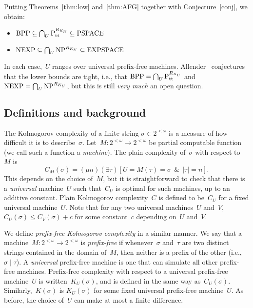 \documentclass{LMCS}
\newcommand{\0}{\mathbf{0}}
\newcommand{\<}{\langle}
\renewcommand{\>}{\rangle}
\begin{document}
Putting Theorems~\ref{thm:low} and~\ref{thm:AFG} together with
Conjecture~\ref{conj}, we obtain:
\begin{itemize}
\item $\textup{BPP}\subseteq\bigcap_{U}\textup{P}_\text{tt}^{R_{K_U}}
    \subseteq\textup{PSPACE}$
\item $\textup{NEXP}\subseteq\bigcap_{U}\textup{NP}^{R_{K_U}}
    \subseteq\textup{EXPSPACE}$
\end{itemize}
In each case,~$U$ ranges over universal prefix-free machines.
Allender~\cite{allender} conjectures that the lower bounds are tight, i.e.,
that $\textup{BPP} = \bigcap_{U}\textup{P}_\text{tt}^{R_{K_U}}$ and
$\textup{NEXP} = \bigcap_{U}\textup{NP}^{R_{K_U}}$, but this is still
\emph{very much} an open question.

\subsection{Definitions and background}\label{background}

The Kolmogorov complexity of a finite string \mbox{$\sigma\in 2^{<\omega}$}
is a measure of how difficult it is to describe~$\sigma$. Let~$M\colon
2^{<\omega}\to 2^{<\omega}$ be partial computable function (we call such a
function a \emph{machine}). The plain complexity of~$\sigma$ with respect
to~$M$ is
\[
C_M(\sigma)=(\mu n)(\exists \tau)[U=M(\tau)=\sigma\ \ \& \ \ |\tau|=n].
\]
This depends on the choice of~$M$, but it is straightforward to check that
there is a \emph{universal} machine~$U$ such that~$C_U$ is optimal for such
machines, up to an additive constant. Plain Kolmogorov complexity~$C$ is
defined to be~$C_U$ for a fixed universal machine~$U$. Note that for any two
universal machines~$U$ and~$V$, $C_U(\sigma)\leq C_V(\sigma)+c$ for some
constant~$c$ depending on~$U$ and~$V$.

We define \emph{prefix-free Kolmogorov complexity} in a similar manner. We
say that a machine~$M\colon 2^{<\omega}\to 2^{<\omega}$ is \emph{prefix-free}
if whenever~$\sigma$ and~$\tau$ are two distinct strings contained in the
domain of~$M$, then neither is a prefix of the other (i.e.,
$\sigma\mid\tau$).  A \emph{universal} prefix-free machine is one that can
simulate all other prefix-free machines. Prefix-free complexity with respect
to a universal prefix-free machine~$U$ is written~$K_U(\sigma)$, and is
defined in the same way as~$C_U(\sigma)$.  Similarly,~$K(\sigma)$ is
$K_U(\sigma)$ for some fixed universal prefix-free machine~$U$.  As before,
the choice of~$U$ can make at most a finite difference.
\end{document}
